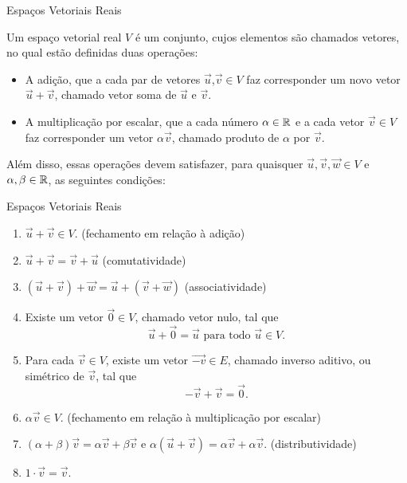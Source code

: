 \begin{frame}[label=vetores]{Espaços Vetoriais Reais}

Um {\color{blue}espaço vetorial real} $V$ é um conjunto, cujos elementos são chamados {\color{blue} vetores}, no qual estão definidas duas operações:

\begin{itemize}
\item A {\color{blue} adição}, que a cada par de vetores $\vec{u}$,$\vec{v}\in V$ faz corresponder um novo vetor $\vec{u}+\vec{v}$, chamado {\color{blue}vetor soma} de $\vec{u}$ e $\vec{v}$.

\item A {\color{blue} multiplicação por escalar}, que a cada número $\alpha\in \mathbb{R}$ e a cada vetor $\vec{v}\in V$ faz corresponder um vetor $\alpha \vec{v}$, chamado {\color{blue}produto de $\alpha$ por $\vec{v}$}.
\end{itemize}
Além disso, essas operações devem satisfazer, para quaisquer $\vec{u},\vec{v},\vec{w}\in V$ e $\alpha,\beta \in \mathbb{R}$, as seguintes condições:
\end{frame}


\begin{frame}[label=vetores]{Espaços Vetoriais Reais}

\begin{enumerate}

\item $\vec{u}+\vec{v}\in V$. (fechamento em relação à adição)
\item $\vec{u}+\vec{v}=\vec{v}+\vec{u}$ (comutatividade)
\item $(\vec{u}+\vec{v})+\vec{w}=\vec{u}+(\vec{v}+\vec{w})$ (associatividade)
\item Existe um vetor $\vec{0}\in V$, chamado {\color{blue}vetor nulo}, tal que
\[\vec{u}+\vec{0}=\vec{u} \text{ para todo } \vec{u}\in V.\]

\item Para cada $\vec{v}\in V$, existe um vetor $\vec{-v}\in E$, chamado {\color{blue}inverso aditivo}, ou {\color{blue}simétrico} de $\vec{v}$, tal que
\[-\vec{v}+\vec{v}=\vec{0}.\]

\item $\alpha \vec{v}\in V$. (fechamento em relação à multiplicação por escalar)

\item $(\alpha+\beta)\vec{v}=\alpha \vec{v}+\beta \vec{v}$ e $\alpha(\vec{u}+\vec{v})=\alpha\vec{v}+\alpha\vec{v}$. (distributividade)

\item $1\cdot \vec{v}=\vec{v}$.
\end{enumerate}
\end{frame}

